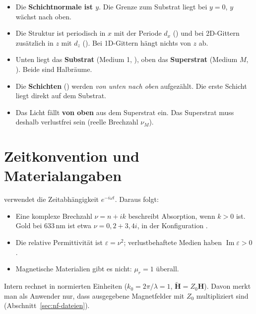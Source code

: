 \begin{itemize}
  \item Die \textbf{Schichtnormale ist $y$}. Die Grenze zum Substrat liegt bei $y=0$, $y$ wächst nach oben.
  \item Die Struktur ist periodisch in $x$ mit der Periode $d_x$ () und bei 2D-Gittern zusätzlich
        in $z$ mit $d_z$ (). Bei 1D-Gittern hängt nichts von $z$ ab.
  \item Unten liegt das \textbf{Substrat} (Medium 1, ), oben das \textbf{Superstrat} (Medium $M$,
        ). Beide sind Halbräume.
  \item Die \textbf{Schichten} () werden \emph{von unten nach oben} aufgezählt. Die erste Schicht liegt
        direkt auf dem Substrat.
  \item Das Licht fällt \textbf{von oben} aus dem Superstrat ein. Das Superstrat muss deshalb verlustfrei sein
        (reelle Brechzahl $\nu_M$).
\end{itemize}

\section{Zeitkonvention und Materialangaben}
%
\FG{} verwendet die Zeitabhängigkeit $e^{-i\omega t}$. Daraus folgt:
\begin{itemize}
  \item Eine komplexe Brechzahl $\nu = n + ik$ beschreibt Absorption, wenn $k>0$ ist. Gold bei 633\,nm ist etwa
        $\nu = 0{,}2+3{,}4i$, in der Konfiguration \val{[0.2, 3.4]}.
  \item Die relative Permittivität ist $\varepsilon=\nu^2$; verlustbehaftete Medien haben
        $\operatorname{Im}\varepsilon>0$.
  \item Magnetische Materialien gibt es nicht: $\mu_r = 1$ überall.
\end{itemize}
Intern rechnet \FG{} in normierten Einheiten ($k_0 = 2\pi/\lambda = 1$, $\tilde{\mathbf H} = Z_0\mathbf H$). Davon
merkt man als Anwender nur, dass ausgegebene Magnetfelder mit $Z_0$ multipliziert sind (Abschnitt~\ref{sec:nf-dateien}).


